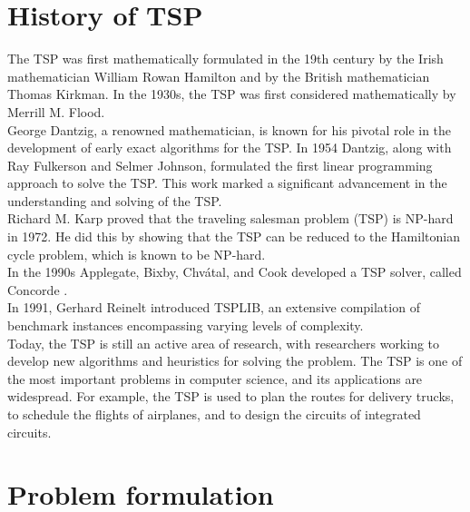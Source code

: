 \section{History of TSP}
The TSP was first mathematically formulated in the 19th century by the Irish mathematician William Rowan Hamilton and by the British mathematician Thomas Kirkman. In the 1930s, the TSP was first considered mathematically by Merrill M. Flood.\\
George Dantzig, a renowned mathematician, is known for his pivotal role in the development of early exact algorithms for the TSP. In 1954 Dantzig, along with Ray Fulkerson and Selmer Johnson, formulated the first linear programming approach to solve the TSP. This work marked a significant advancement in the understanding and solving of the TSP.\\
Richard M. Karp proved that the traveling salesman problem (TSP) is NP-hard in 1972. He did this by showing that the TSP can be reduced to the Hamiltonian cycle problem, which is known to be NP-hard.\\
In the 1990s  Applegate, Bixby, Chvátal, and Cook developed a TSP solver, called Concorde \cite{Concorde}. \\
In 1991, Gerhard Reinelt introduced TSPLIB, an extensive compilation of benchmark instances encompassing varying levels of complexity.\\
Today, the TSP is still an active area of research, with researchers working to develop new algorithms and heuristics for solving the problem. The TSP is one of the most important problems in computer science, and its applications are widespread. For example, the TSP is used to plan the routes for delivery trucks, to schedule the flights of airplanes, and to design the circuits of integrated circuits.


\section{Problem formulation}

